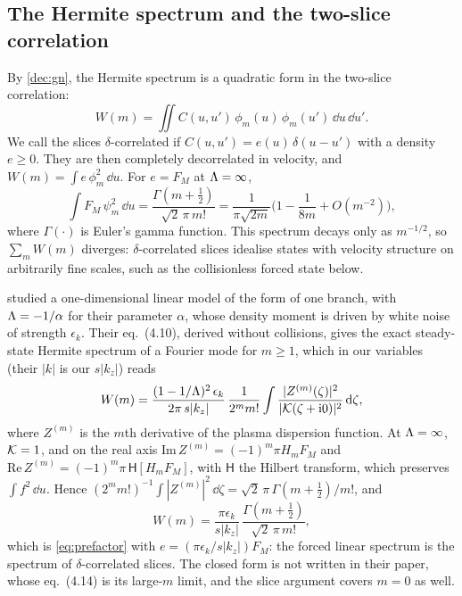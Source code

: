 \subsection{The Hermite spectrum and the two-slice correlation}\label{dec:sec-dictionary}

By \eqref{dec:gn}, the Hermite spectrum is a quadratic form in the two-slice correlation:
\begin{equation}\label{eq:dictionary}
  W(m)=\iint C(u,u')\,\phi_m(u)\,\phi_m(u')\,\dd u\,\dd u' .
\end{equation}
We call the slices $\delta$-correlated if $C(u,u')=e(u)\,\delta(u-u')$ with a density $e\ge0$. They are then completely decorrelated in velocity, and $W(m)=\int e\,\phi_m^2\,\dd u$. For $e=F_M$ at $\Lambda=\infty$,
\begin{equation}\label{eq:prefactor}
  \int F_M\,\psi_m^2\,\dd u=\frac{\Gamma(m+\frac12)}{\sqrt2\,\pi\,m!}=\frac{1}{\pi\sqrt{2m}}\Big(1-\frac{1}{8m}+O(m^{-2})\Big),
\end{equation}
where $\Gamma(\cdot)$ is Euler's gamma function. This spectrum decays only as $m^{-1/2}$, so $\sum_mW(m)$ diverges: $\delta$-correlated slices idealise states with velocity structure on arbitrarily fine scales, such as the collisionless forced state below.

\citet{Kanekar2015} studied a one-dimensional linear model of the form of one branch, with $\Lambda=-1/\alpha$ for their parameter $\alpha$, whose density moment is driven by white noise of strength $\epsilon_k$. Their eq.~(4.10), derived without collisions, gives the exact steady-state Hermite spectrum of a Fourier mode for $m\ge1$, which in our variables (their $|k|$ is our $s|k_z|$) reads
\begin{equation*}
  W(m)=\frac{(1-1/\Lambda)^2\,\epsilon_k}{2\pi\,s|k_z|}\,\frac{1}{2^mm!}\int\frac{|Z^{(m)}(\zeta)|^2}{|\mathcal K(\zeta+\mathrm{i}0)|^2}\,\mathrm{d}\zeta ,
\end{equation*}
where $Z^{(m)}$ is the $m$th derivative of the plasma dispersion function. At $\Lambda=\infty$, $\mathcal K=1$, and on the real axis $\mathrm{Im}\,Z^{(m)}=(-1)^m\pi H_mF_M$ and $\mathrm{Re}\,Z^{(m)}=(-1)^m\pi\,\mathsf H[H_mF_M]$, with $\mathsf H$ the Hilbert transform, which preserves $\int f^2\,\dd u$. Hence $(2^mm!)^{-1}\int|Z^{(m)}|^2\,\dd\zeta=\sqrt2\,\pi\,\Gamma(m+\frac12)/m!$, and
\begin{equation}\label{dec:kanekar}
  W(m)=\frac{\pi\epsilon_k}{s|k_z|}\,\frac{\Gamma(m+\frac12)}{\sqrt2\,\pi\,m!} ,
\end{equation}
which is \eqref{eq:prefactor} with $e=(\pi\epsilon_k/s|k_z|)F_M$: the forced linear spectrum is the spectrum of $\delta$-correlated slices. The closed form is not written in their paper, whose eq.~(4.14) is its large-$m$ limit, and the slice argument covers $m=0$ as well.

